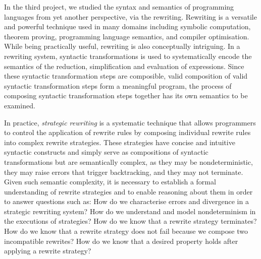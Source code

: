 In the third project, we studied the syntax and semantics of programming languages from yet another perspective, via the rewriting.
Rewriting is a versatile and powerful technique used in many domains including symbolic computation, theorem proving, programming language semantics, and compiler optimisation.
While being practically useful, rewriting is also conceptually intriguing. In a rewriting system, syntactic transformations is used to systematically encode the semantics of the reduction, simplification and evaluation of expressions. Since these syntactic transformation steps are composible, valid composition of valid syntactic transformation steps form a meaningful program, the process of composing syntactic transformation steps together has its own semantics to be examined. 

In practice, \emph{strategic rewriting} is a systematic technique that allows programmers to control the application of rewrite rules by composing individual rewrite rules into complex rewrite strategies. These strategies have concise and intuitive syntactic constructs and simply serve as compositions of syntactic transformations but are semantically complex, as they may be nondeterministic, they may raise errors that trigger backtracking, and they may not terminate.
Given such semantic complexity, it is necessary to establish a formal understanding of rewrite strategies and to enable reasoning about them in order to answer questions such as:
How do we characterise errors and divergence in a strategic rewriting system?
How do we understand and model nondeterminism in the executions of strategies?
How do we know that a rewrite strategy terminates?
How do we know that a rewrite strategy does not fail because we compose two incompatible rewrites?
How do we know that a desired property holds after applying a rewrite strategy?

